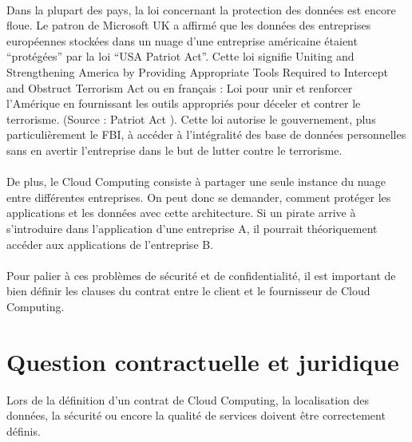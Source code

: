 \documentclass[a4paper,12pt]{report}
\begin{document}
\begin{onehalfspace}
	\paragraph*{}
	Dans la plupart des pays, la loi concernant la protection des données est encore floue. Le patron de Microsoft UK a affirmé que les données des entreprises européennes stockées dans un nuage d’une entreprise américaine étaient “protégées” par la loi “USA Patriot Act”. Cette loi signifie Uniting and Strengthening America by Providing Appropriate Tools Required to Intercept and Obstruct Terrorism Act ou en français : Loi pour unir et renforcer l'Amérique en fournissant les outils appropriés pour déceler et contrer le terrorisme. (Source : Patriot Act \cite{source:patriotact}). Cette loi autorise le gouvernement, plus particulièrement le FBI, à accéder à l’intégralité des base de données personnelles sans en avertir l’entreprise dans le but de lutter contre le terrorisme.

	\paragraph*{}
	De plus, le Cloud Computing consiste à partager une seule instance du nuage entre différentes entreprises. On peut donc se demander, comment protéger les applications et les données avec cette architecture. Si un pirate arrive à s’introduire dans l’application d’une entreprise A, il pourrait théoriquement accéder aux applications de l’entreprise B.

	\paragraph*{}
	Pour palier à ces problèmes de sécurité et de confidentialité, il est important de bien définir les clauses du contrat entre le client et le fournisseur de Cloud Computing.

	\section{Question contractuelle et juridique}
	Lors de la définition d’un contrat de Cloud Computing, la localisation des données, la sécurité ou encore la qualité de services doivent être correctement définis.


\end{onehalfspace}
\end{document}
